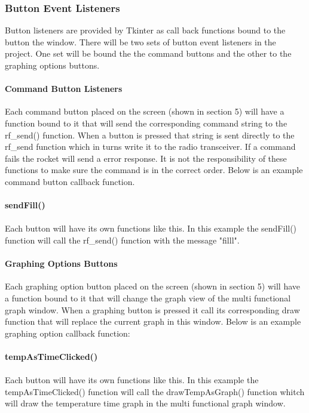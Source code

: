 \documentclass[10pt,draftclsnofoot,onecolumn,retainorgcmds]{IEEEtran}
\begin{document}
\subsubsection{Button Event Listeners}
Button listeners are provided by Tkinter as call back functions bound to the button the window. There will be two sets of button event listeners in the project. One set will be bound the the command buttons and the other to the graphing options buttons.
\paragraph{Command Button Listeners}
Each command button placed on the screen (shown in section 5) will have a function bound to it that will send the corresponding command string to the rf\_send() function. When a button is pressed that string is sent directly to the rf\_send function which in turns write it to the radio transceiver. If a command fails the rocket will send a error response. It is not the responsibility of these functions to make sure the command is in the correct order. Below is an example command button callback function. \\ \\
{\bf sendFill() }
\\  \\
Each button will have its own functions like this. In this example the sendFill() function will call the rf\_send() function with the message "filll".

\paragraph{Graphing Options Buttons}
Each graphing option button placed on the screen (shown in section 5) will have a function bound to it that will change the graph view of the multi functional graph window. When a graphing button is pressed it call its corresponding draw function that will replace the current graph in this window. Below is an example graphing option callback function: \\ \\
{\bf tempAsTimeClicked()} \\ \\
Each button will have its own functions like this. In this example the tempAsTimeClicked() function will call the drawTempAsGraph() function whitch will draw the temperature time graph in the multi functional graph window.
\end{document}
